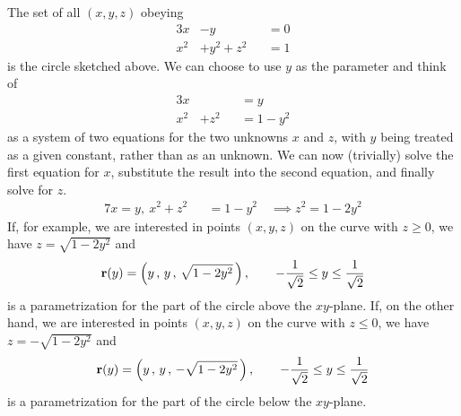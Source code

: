 \begin{eg}\label{eg:paramIntersectA}
The set of all $(x,y,z)$ obeying
\begin{alignat*}{3}
 x&-y           &&=0 \\
 x^2&+y^2 +z^2 &&=1
\end{alignat*}
is the circle sketched above. We can choose to use $y$ as the parameter and think of 
\begin{alignat*}{3}
 x&    &&=y \\
 x^2&+z^2  &&=1-y^2
\end{alignat*}
as a system of two equations for the two unknowns $x$ and $z$,
with $y$ being treated as a given constant, rather than as an unknown.
We can now (trivially) solve the first equation for $x$, substitute 
the result into the second equation, and finally solve for $z$.
\begin{alignat*}{7}
x=y,\  x^2+z^2  &&=1-y^2 \quad \implies z^2 = 1-2y^2
\end{alignat*}
If, for example, we are interested in points $(x,y,z)$ on the curve with 
$z\ge 0$, we have $z=\sqrt{1-2y^2} $ and 
\begin{equation*}
\mathbf{r}(y) = \left(y\,,\,y\,,\,\sqrt{1-2y^2}\,\right),\qquad
-\frac{1}{\sqrt{2}}\le y \le \frac{1}{\sqrt{2}}
\end{equation*}
is a parametrization for the part of the circle above the $xy$-plane.
If, on the other hand, we are interested in points $(x,y,z)$ on the curve with 
$z\le 0$, we have $z=-\sqrt{1-2y^2} $ and 
\begin{equation*}
\mathbf{r}(y) = \left(y\,,\,y\,,\,-\sqrt{1-2y^2}\,\right),\qquad
-\frac{1}{\sqrt{2}}\le y \le \frac{1}{\sqrt{2}}
\end{equation*}
is a parametrization for the part of the circle below the $xy$-plane.
\end{eg}




